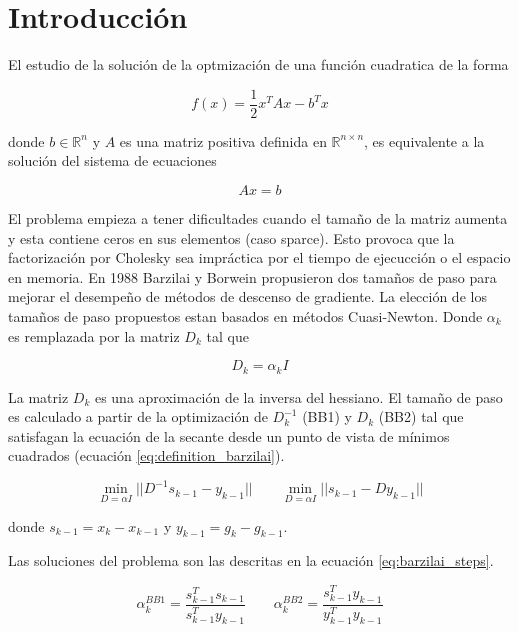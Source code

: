 \section*{Introducción}

El estudio de la solución de la optmización de una función cuadratica de la forma

\begin{equation}
    f(x) = \frac{1}{2}x^TAx- b^Tx \label{eq:quadratic_function}
\end{equation}

donde $b\in\mathbb{R}^n$ y $A$ es una matriz positiva definida en $\mathbb{R}^{n\times n}$, es equivalente a la solución del sistema de ecuaciones

\begin{equation*}
    Ax=b
\end{equation*}

El problema empieza a tener dificultades cuando el tamaño de la matriz aumenta y esta contiene ceros en sus elementos (caso sparce). Esto provoca que la factorización por Cholesky sea impráctica por el tiempo de ejecucción o el espacio en memoria.  En 1988 Barzilai y Borwein propusieron dos tamaños de paso para mejorar el desempeño de métodos de descenso de gradiente. La elección de los tamaños de paso propuestos estan basados en métodos Cuasi-Newton. Donde $\alpha_k$ es remplazada por la matriz $D_k$ tal que

\begin{equation}
    D_k = \alpha_k \mathit{I}
\end{equation}

La matriz $D_k$ es una aproximación de la inversa del hessiano. El tamaño de paso es calculado a partir de la optimización de $D_k^{-1}$  (BB1) y  $D_k$ (BB2) tal que satisfagan la ecuación de la secante desde un punto de vista de mínimos cuadrados (ecuación \ref{eq:definition_barzilai}).

\begin{equation}
    \min_{D=\alpha \mathit{I}} ||D^{-1}s_{k-1}-y_{k-1}|| \qquad \min_{D=\alpha \mathit{I}} ||s_{k-1}-Dy_{k-1}|| \label{eq:definition_barzilai}
\end{equation}

donde $s_{k-1} = x_k - x_{k-1}$ y $y_{k-1} = g_k - g_{k-1}$.

Las soluciones del problema son las descritas en la ecuación \ref{eq:barzilai_steps}.

\begin{equation}
    \alpha^{BB1}_k = \frac{s^T_{k-1}s_{k-1}}{s^T_{k-1}y_{k-1}} \qquad \alpha_k^{BB2} = \frac{s_{k-1}^Ty_{k-1}}{y_{k-1}^Ty_{k-1}} \label{eq:barzilai_steps}
\end{equation}

